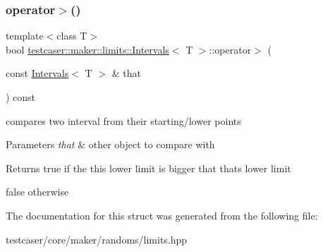 \subsubsection{\texorpdfstring{operator$>$()}{operator>()}}
{\footnotesize\ttfamily template$<$class T$>$ \\
bool \hyperlink{structtestcaser_1_1maker_1_1limits_1_1Intervals}{testcaser\+::maker\+::limits\+::\+Intervals}$<$ T $>$\+::operator$>$ (\begin{DoxyParamCaption}\item[{const \hyperlink{structtestcaser_1_1maker_1_1limits_1_1Intervals}{Intervals}$<$ T $>$ \&}]{that }\end{DoxyParamCaption}) const\hspace{0.3cm}{\ttfamily [inline]}}



compares two interval from their starting/lower points 


\begin{DoxyParams}{Parameters}
{\em that} & other object to compare with \\
\hline
\end{DoxyParams}
\begin{DoxyReturn}{Returns}
true if the this lower limit is bigger that that\textquotesingle{}s lower limit 

false otherwise 
\end{DoxyReturn}


The documentation for this struct was generated from the following file\+:\begin{DoxyCompactItemize}
\item 
testcaser/core/maker/randoms/limits.\+hpp\end{DoxyCompactItemize}
